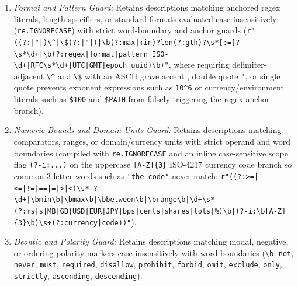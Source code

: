 \documentclass[conference,10pt]{IEEEtran}
\begin{document}
\begin{enumerate}
    \item \textit{Format and Pattern Guard:} Retains descriptions matching anchored regex literals, length specifiers, or standard formats evaluated case-insensitively (\texttt{re.\allowbreak IGNORECASE}) with strict word-boundary and anchor guards (\texttt{r"((?:\textasciigrave|"|\textquotesingle)\textbackslash\string^|\allowbreak\textbackslash\$(?:\textasciigrave|"|\textquotesingle)|\allowbreak\textbackslash b(?:max|\allowbreak min)?\allowbreak len(?:gth)?\allowbreak\textbackslash s*[:=]?\allowbreak\textbackslash s*\textbackslash d+|\allowbreak\textbackslash b(?:regex|\allowbreak format|\allowbreak pattern|\allowbreak ISO-\textbackslash d+|\allowbreak RFC\textbackslash s*\textbackslash d+|\allowbreak UTC|\allowbreak GMT|\allowbreak epoch|\allowbreak uuid)\textbackslash b)"}, where requiring delimiter-adjacent \texttt{\textbackslash\string^} and \texttt{\textbackslash\$} with an ASCII grave accent \texttt{\textasciigrave}, double quote \texttt{"}, or single quote \texttt{\textquotesingle} prevents exponent expressions such as \texttt{10\string^6} or currency/environment literals such as \texttt{\$100} and \texttt{\$PATH} from falsely triggering the regex anchor branch).
    \item \textit{Numeric Bounds and Domain Units Guard:} Retains descriptions matching comparators, ranges, or domain/currency units with strict operand and word boundaries (compiled with \texttt{re.\allowbreak IGNORECASE} and an inline case-sensitive scope flag \texttt{(?-i:...)} on the uppercase \texttt{[A-Z]\{3\}} ISO-4217 currency code branch so common 3-letter words such as \texttt{"the code"} never match: \texttt{r"((?:>=|\allowbreak<=|\allowbreak!=|\allowbreak==|\allowbreak=|\allowbreak>|\allowbreak<)\textbackslash s*-?\textbackslash d+|\allowbreak\textbackslash bmin\textbackslash b|\allowbreak\textbackslash bmax\textbackslash b|\allowbreak\textbackslash bbetween\textbackslash b|\allowbreak\textbackslash brange\textbackslash b|\allowbreak\textbackslash d+\textbackslash s*(?:ms|\allowbreak s|\allowbreak MB|\allowbreak GB|\allowbreak USD|\allowbreak EUR|\allowbreak JPY|\allowbreak bps|\allowbreak cents|\allowbreak shares|\allowbreak lots|\allowbreak\%)\textbackslash b|\allowbreak(?-i:\textbackslash b[A-Z]\{3\}\textbackslash b)\textbackslash s+(?:currency|\allowbreak code))"}).
    \item \textit{Deontic and Polarity Guard:} Retains descriptions matching modal, negative, or ordering polarity markers case-insensitively with word boundaries (\texttt{\textbackslash b}: \texttt{not}, \texttt{never}, \texttt{must}, \texttt{required}, \texttt{disallow}, \texttt{prohibit}, \texttt{forbid}, \texttt{omit}, \texttt{exclude}, \texttt{only}, \texttt{strictly}, \texttt{ascending}, \texttt{descending}).

\end{enumerate}
\end{document}

